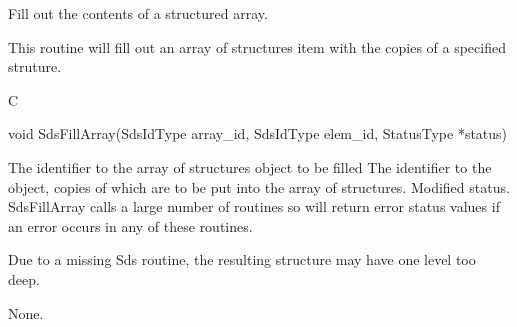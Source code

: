 \begin{manroutinedescription}
 	Fill out the contents of a structured array.

 	This routine will fill out an array of structures item with
 	the copies of a specified struture.
 
      C

      void SdsFillArray(SdsIdType array\_{}id, SdsIdType elem\_{}id, %
StatusType *status)
 
\begin{manparametertable}
  The identifier to the %
array of structures
      				object to be filled
  The identifier to the %
object, copies
      				of which are to be put into the array
      				of structures.
 Modified status. SdsFillArray %
calls a large number
                             of {} routines so will return error %
status
                             values if an error occurs in any of these
                             routines.
 

\end{manparametertable}
 	Due to a missing Sds routine, the resulting structure may have one
 	level too deep.

      None.

\end{manroutinedescription}
